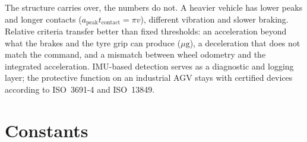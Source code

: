 \documentclass[11pt,a4paper]{article}
\newcommand{\gu}{\mathrm{g}}
\begin{document}
The structure carries over, the numbers do not. A heavier vehicle has lower peaks and longer
contacts ($a_\text{peak} t_\text{contact} = \pi v$), different vibration and slower braking.
Relative criteria transfer better than fixed thresholds: an acceleration beyond what the brakes
and the tyre grip can produce ($\mu \gu$), a deceleration that does not match the command, and a
mismatch between wheel odometry and the integrated acceleration. IMU-based detection serves as a
diagnostic and logging layer; the protective function on an industrial AGV stays with certified
devices according to ISO~3691-4 and ISO~13849.

\appendix
\section{Constants}
\end{document}
